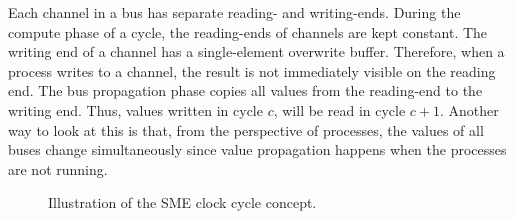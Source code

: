 Each channel in a bus has separate reading- and writing-ends. During the compute
phase of a cycle, the reading-ends of channels are kept constant. The writing
end of a channel has a single-element overwrite buffer. Therefore, when a
process writes to a channel, the result is not immediately visible on the
reading end. The bus propagation phase copies all values from the reading-end to
the writing end. Thus, values written in cycle $c$, will be read in cycle
$c+1$. Another way to look at this is that, from the perspective of processes,
the values of all buses change simultaneously since value propagation happens
when the processes are not running.


\begin{figure}
  \centering
{}
\caption{Illustration of the SME clock cycle concept.}
\label{fig:smeclock}
\end{figure}






